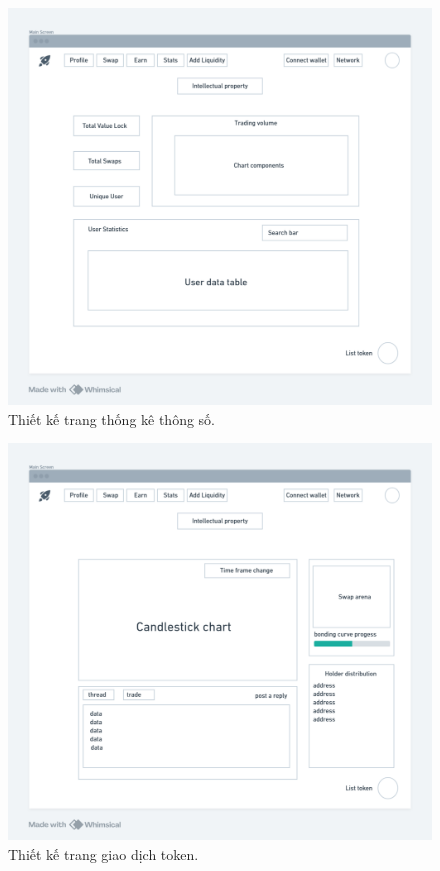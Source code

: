 \begin{figure}[H]
    \centering
    \includegraphics[width=1\textwidth]{figures/c2/Stats.png}
    \caption{Thiết kế trang thống kê thông số.}
    \label{fig:architecture-diagram}
\end{figure}

\begin{figure}[H]
    \centering
    \includegraphics[width=1\textwidth]{figures/c2/Trade.png}
    \caption{Thiết kế trang giao dịch token.}
    \label{fig:architecture-diagram}
\end{figure}
